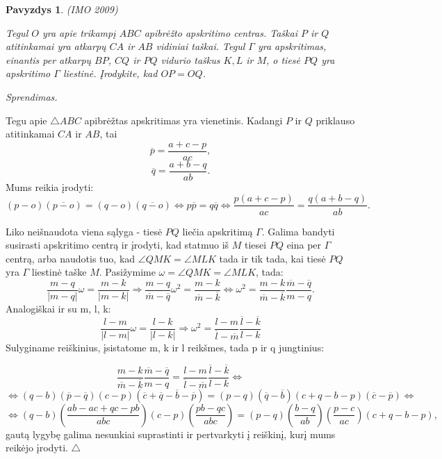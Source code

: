 \documentclass[11pt,a4paper,twoside]{book}
\newenvironment{sprendimas}{\noindent \textit{Sprendimas.}}{\hfill $\triangle$}
\newcounter{foo}[subsection]
\newtheorem{pavnr}[foo]{Pavyzdys}
\theoremstyle{definition} \newtheorem*{api}{Apibrėžimas}
\theoremstyle{remark} \newtheorem*{pastaba}{Pastaba}
\begin{document}
\begin{pavnr}
(IMO 2009)

Tegul $O$ yra apie trikampį $ABC$ apibrėžto apskritimo centras. Taškai $P$ ir $Q$ atitinkamai yra atkarpų $CA$ ir $AB$ vidiniai taškai. Tegul $\Gamma$ yra apskritimas, einantis per atkarpų $BP$, $CQ$ ir $PQ$ vidurio taškus $K, L$ ir $M$, o tiesė $PQ$ yra apskritimo $\Gamma$ liestinė. Įrodykite, kad $OP = OQ$.
\end{pavnr}
\begin{sprendimas}

Tegu apie $\bigtriangleup ABC$ apibrėžtas apskritimas yra vienetinis. Kadangi $P$ ir $Q$ priklauso atitinkamai $CA$ ir $AB$, tai
$$\overline{p}=\frac{a+c-p}{ac},$$
$$\overline{q}=\frac{a+b-q}{ab}.$$
Mums reikia įrodyti:
$$(p-o)(\overline{p-o})=(q-o)(\overline{q-o}) \Leftrightarrow p\overline{p}=q\overline{q} \Leftrightarrow \frac{p(a+c-p)}{ac}=\frac{q(a+b-q)}{ab}.$$

Liko neišnaudota viena sąlyga - tiesė $PQ$ liečia apskritimą $\Gamma$. Galima bandyti susirasti apskritimo centrą ir įrodyti, kad statmuo iš $M$ tiesei $PQ$ eina per $\Gamma$ centrą, arba naudotis tuo, kad $\angle QMK=\angle MLK$ tada ir tik tada, kai tiesė $PQ$ yra $\Gamma$ liestinė taške $M$. Pasižymime $\omega=\angle QMK=\angle MLK$, tada:
$$\frac{m-q}{|m-q|}\omega=\frac{m-k}{|m-k|} \Rightarrow \frac{m-q}{\overline{m}-\overline{q}}\omega^2=\frac{m-k}{\overline{m}-\overline{k}} \Leftrightarrow \omega^2=\frac{m-k}{\overline{m}-\overline{k}} \frac{\overline{m}-\overline{q}}{m-q}.$$
Analogiškai ir su m, l, k:
$$\frac{l-m}{|l-m|}\omega=\frac{l-k}{|l-k|} \Rightarrow  \omega^2=\frac{l-m}{\overline{l}-\overline{m}}\frac{\overline{l}-\overline{k}}{l-k}$$
Sulyginame reiškinius, įsistatome m, k ir l reikšmes, tada p ir q jungtinius:

\begin{equation*}
 \frac{m-k}{\overline{m}-\overline{k}} \frac{\overline{m}-\overline{q}}{m-q}=\frac{l-m}{\overline{l}-\overline{m}}\frac{\overline{l}-\overline{k}}{l-k} \Leftrightarrow 
\end{equation*}
\begin{equation*}
 \Leftrightarrow (q-b)(\overline{p}-\overline{q})(c-p)(\overline{c}+\overline{q}-\overline{b}-\overline{p})=(p-q)(\overline{q}-\overline{b})(c+q-b-p)(\overline{c}-\overline{p}) \Leftrightarrow
\end{equation*}
\begin{equation*}
\Leftrightarrow (q-b)(\frac{ab-ac+qc-pb}{abc})(c-p)(\frac{pb-qc}{abc})=(p-q)(\frac{b-q}{ab})(\frac{p-c}{ac})(c+q-b-p),
\end{equation*}
gautą lygybę galima nesunkiai suprastinti ir pertvarkyti į reiškinį, kurį mums reikėjo įrodyti.
\end{sprendimas}
\end{document}
